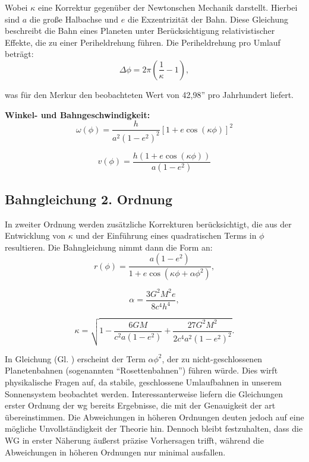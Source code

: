 Wobei $\kappa$ eine Korrektur gegenüber der Newtonschen Mechanik darstellt. Hierbei sind $a$ die große Halbachse und $e$ die Exzentrizität der Bahn.
Diese Gleichung beschreibt die Bahn eines Planeten unter Berücksichtigung relativistischer Effekte, die zu einer Periheldrehung führen.
Die Periheldrehung pro Umlauf beträgt:
\begin{equation}
    \Delta \phi = 2\pi \left(\frac{1}{\kappa} - 1\right),
\end{equation}

was für den Merkur den beobachteten Wert von 42,98'' pro Jahrhundert liefert.

\textbf{Winkel- und Bahngeschwindigkeit:}
\begin{equation}
    \omega(\phi) = \frac{h}{a^2(1 - e^2)^2} \left[1 + e \cos(\kappa \phi)\right]^2    
\end{equation}

\begin{equation}
    v(\phi) = \frac{h \left(1 + e \cos(\kappa \phi)\right)}{a(1 - e^2)}
\end{equation}

\subsection{Bahngleichung 2. Ordnung}
In zweiter Ordnung werden zusätzliche Korrekturen berücksichtigt, die aus der Entwicklung von $\kappa$ und der Einführung eines quadratischen Terms in $\phi$ resultieren.
Die Bahngleichung nimmt dann die Form an:
\begin{equation}
    \label{eq:weber_r_2_ordnung}
    r(\phi) = \frac{a(1 - e^2)}{1 + e \cos(\kappa \phi + \alpha \phi^2)},
\end{equation}

\begin{equation}
\alpha = \frac{3G^2 M^2 e}{8c^4 h^4},
\end{equation}

\begin{equation}
\kappa = \sqrt{1 - \frac{6GM}{c^2 a(1 - e^2)} + \frac{27G^2 M^2}{2c^4 a^2 (1 - e^2)^2}}.
\end{equation}

In Gleichung (Gl. ) erscheint der Term $\alpha \phi^2$, der zu nicht-geschlossenen Planetenbahnen (sogenannten \enquote{Rosettenbahnen}) führen würde.
Dies wirft physikalische Fragen auf, da stabile, geschlossene Umlaufbahnen in unserem Sonnensystem beobachtet werden. Interessanterweise liefern die Gleichungen erster Ordnung
der \gls{wg} bereits Ergebnisse, die mit der Genauigkeit der \gls{art} übereinstimmen. Die Abweichungen in höheren Ordnungen deuten jedoch auf eine mögliche Unvollständigkeit der
Theorie hin. Dennoch bleibt festzuhalten, dass die WG in erster Näherung äußerst präzise Vorhersagen trifft, während die Abweichungen in höheren Ordnungen nur minimal ausfallen.

